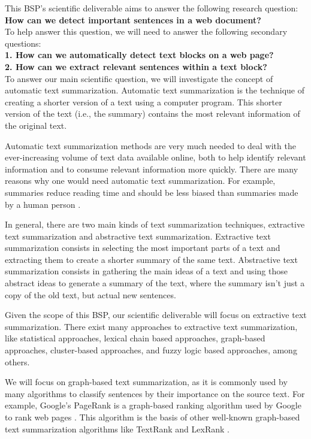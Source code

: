 \documentclass[conference,compsoc]{IEEEtran}
\begin{document}
This BSP's scientific deliverable aims to answer the following research question:\\

\textbf{How can we detect important sentences in a web document?}\\

To help answer this question, we will need to answer the following secondary questions:\\

\textbf{1. How can we automatically detect text blocks on a web page?}\\

\textbf{2. How can we extract relevant sentences within a text block?}\\

To answer our main scientific question, we will investigate the concept of automatic text summarization. Automatic text summarization is the technique of creating a shorter version of a text using a computer program. This shorter version of the text (i.e., the summary) contains the most relevant information of the original text.

Automatic text summarization methods are very much needed to deal with the ever-increasing volume of text data available online, both to help identify relevant information and to consume relevant information more quickly. There are many reasons why one would need automatic text summarization. For example, summaries reduce reading time and should be less biased than summaries made by a human person \cite{torres2014automatic}.

In general, there are two main kinds of text summarization techniques, extractive text summarization and abstractive text summarization. Extractive text summarization consists in selecting the most important parts of a text and extracting them to create a shorter summary of the same text. Abstractive text summarization consists in gathering the main ideas of a text and using those abstract ideas to generate a summary of the text, where the summary isn't just a copy of the old text, but actual new sentences.

Given the scope of this BSP, our scientific deliverable will focus on extractive text summarization. There exist many approaches to extractive text summarization, like statistical approaches, lexical chain based approaches, graph-based approaches, cluster-based approaches, and fuzzy logic based approaches, among others.

We will focus on graph-based text summarization, as it is commonly used by many algorithms to classify sentences by their importance on the source text. For example, Google's PageRank is a graph-based ranking algorithm used by Google to rank web pages \cite{page1999pagerank}. This algorithm is the basis of other well-known graph-based text summarization algorithms like TextRank \cite{mihalcea2004textrank} and LexRank \cite{erkan2004lexrank}.
\end{document}
